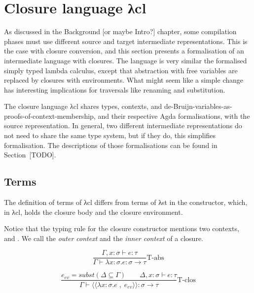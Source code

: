 \documentclass[bsc,frontabs,oneside,singlespacing,parskip,deptreport]{infthesis}
\theoremstyle{definition}
\theoremstyle{lemma}
\begin{document}
\section{Closure language λcl}
\label{sec:closure-language-cl}

As discussed in the Background [or maybe Intro?] chapter, some
compilation phases must use different source and target intermediate
representations. This is the case with closure conversion, and this
section presents a formalisation of an intermediate language with
closures. The language is very similar the formalised simply typed
lambda calculus, except that abstraction with free variables are
replaced by closures with environments. What might seem like a simple
change has interesting implications for traversals like renaming and
substitution.

The closure language λcl shares types, contexts, and
de-Bruijn-variables-as-proofs-of-context-membership, and their
respective Agda formalisations, with the source representation. In
general, two different intermediate representations do not need to
share the same type system, but if they do, this simplifies
formalisation. The descriptions of those formalisations can be found
in Section~[TODO].

\subsection{Terms}
\label{sec:closure-language-cl-1}

The definition of terms of λcl differs from terms of λst in the 
constructor, which, in λcl, holds the closure body and the closure
environment.


Notice that the typing rule for the closure constructor 
mentions two contexts,  and . We call  the
\textit{outer context} and  the \textit{inner context} of a
closure.

\begin{minipage}{.5\textwidth}
  \[
  \frac
  {\Gamma , x : \sigma \vdash e : \tau}
  {\Gamma \vdash \lambda x : \sigma . e : \sigma \rightarrow \tau}
  \text{T-abs}
  \]
\end{minipage}%
\begin{minipage}{.5\textwidth}
  \[
  \frac
  {e_{ev} = subst ( \Delta \subseteq \Gamma ) \quad \quad \Delta , x : \sigma \vdash e : \tau}
  {\Gamma \vdash \langle\langle \lambda x : \sigma . e \; , \; e_{ev} \rangle\rangle : \sigma \rightarrow \tau}
  \text{T-clos}
  \]
\end{minipage}
\end{document}
